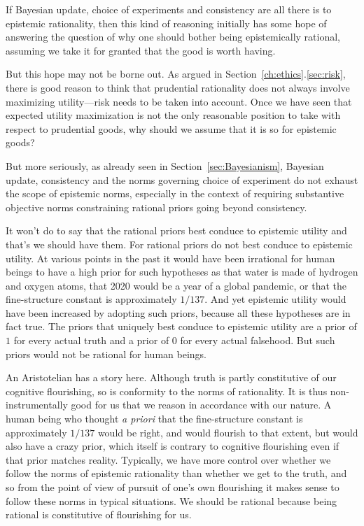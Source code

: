  If Bayesian update, choice of experiments and consistency
are all there is to  epistemic rationality, then this kind of 
reasoning initially has some hope of answering the question 
of why one should bother being epistemically rational, assuming we take it for granted that the good is worth
having. 

But this hope may not be borne out. As argued in Section~\ref{ch:ethics}.\ref{sec:risk}, there is good reason to think that prudential 
rationality does not always involve maximizing utility---risk needs to be taken into account. Once we have
seen that expected utility maximization is not the only reasonable position to take with respect to prudential
goods, why should we assume that it is so for epistemic goods?

But more seriously, as already seen in Section~\ref{sec:Bayesianism}, Bayesian update, consistency and the norms governing choice of experiment do not exhaust the 
scope of epistemic norms, especially in the context of requiring substantive
objective norms constraining rational priors going beyond consistency. 

It won't do to say that the rational priors best conduce to epistemic utility and that's we should have them. 
For rational priors do not best conduce to epistemic utility. At various points in the past it would 
have been irrational for human beings to have a high prior for such hypotheses as that water is made of hydrogen
and oxygen atoms, that 2020 would be a year of a global pandemic, or that the fine-structure constant is 
approximately $1/137$. And yet epistemic utility would have been increased by adopting such priors, because 
all these hypotheses are in fact true. The priors that uniquely best conduce to epistemic utility are a 
prior of $1$ for every actual truth and a prior of $0$ for every actual falsehood. But such priors would not 
be rational for human beings. 

An Aristotelian has a story here. Although truth is partly constitutive of our cognitive flourishing, so is conformity 
to the norms of rationality. It is thus non-instrumentally good for us that we reason in accordance with our 
nature. A human being who thought \textit{a priori} that the fine-structure constant is approximately $1/137$
would be right, and would flourish to that extent, but would also have a crazy prior, which itself is contrary to 
cognitive flourishing even if that prior matches reality. Typically, we have more control over whether we follow the norms of epistemic rationality
than whether we get to the truth, and so from the point of view of pursuit of one's own flourishing it makes
sense to follow these norms in typical situations. We should be rational because being rational is constitutive
of flourishing for us.

